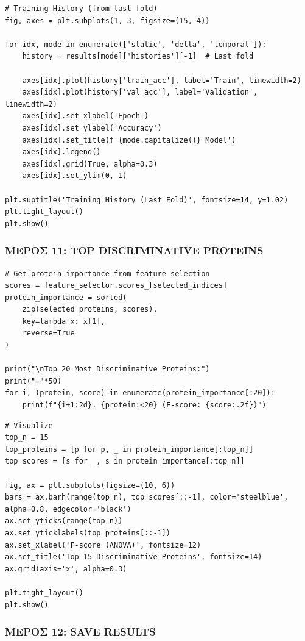 \begin{lstlisting}
# Training History (from last fold)
fig, axes = plt.subplots(1, 3, figsize=(15, 4))
 
for idx, mode in enumerate(['static', 'delta', 'temporal']):
    history = results[mode]['histories'][-1]  # Last fold
 
    axes[idx].plot(history['train_acc'], label='Train', linewidth=2)
    axes[idx].plot(history['val_acc'], label='Validation', linewidth=2)
    axes[idx].set_xlabel('Epoch')
    axes[idx].set_ylabel('Accuracy')
    axes[idx].set_title(f'{mode.capitalize()} Model')
    axes[idx].legend()
    axes[idx].grid(True, alpha=0.3)
    axes[idx].set_ylim(0, 1)
 
plt.suptitle('Training History (Last Fold)', fontsize=14, y=1.02)
plt.tight_layout()
plt.show()
\end{lstlisting}
 
\subsubsection*{ΜΕΡΟΣ 11: TOP DISCRIMINATIVE PROTEINS}
 
\begin{lstlisting}
# Get protein importance from feature selection
scores = feature_selector.scores_[selected_indices]
protein_importance = sorted(
    zip(selected_proteins, scores),
    key=lambda x: x[1],
    reverse=True
)
 
print("\nTop 20 Most Discriminative Proteins:")
print("="*50)
for i, (protein, score) in enumerate(protein_importance[:20]):
    print(f"{i+1:2d}. {protein:<20} (F-score: {score:.2f})")
\end{lstlisting}
 
\begin{lstlisting}
# Visualize
top_n = 15
top_proteins = [p for p, _ in protein_importance[:top_n]]
top_scores = [s for _, s in protein_importance[:top_n]]
 
fig, ax = plt.subplots(figsize=(10, 6))
bars = ax.barh(range(top_n), top_scores[::-1], color='steelblue', alpha=0.8, edgecolor='black')
ax.set_yticks(range(top_n))
ax.set_yticklabels(top_proteins[::-1])
ax.set_xlabel('F-score (ANOVA)', fontsize=12)
ax.set_title('Top 15 Discriminative Proteins', fontsize=14)
ax.grid(axis='x', alpha=0.3)
 
plt.tight_layout()
plt.show()
\end{lstlisting}
 
\subsubsection*{ΜΕΡΟΣ 12: SAVE RESULTS}
 

